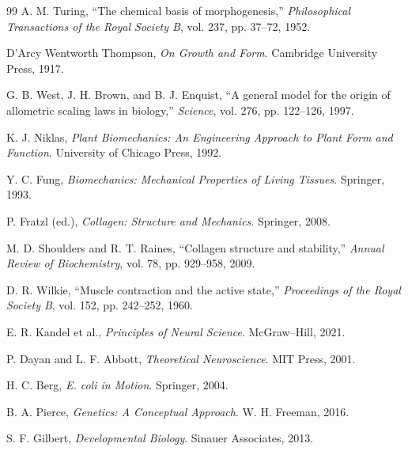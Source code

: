 \documentclass[11pt,oneside]{book}
\begin{document}
\begin{thebibliography}{99}
A. M. Turing,
“The chemical basis of morphogenesis,”
\textit{Philosophical Transactions of the Royal Society B}, vol. 237, pp. 37–72, 1952.

D’Arcy Wentworth Thompson,
\textit{On Growth and Form}.
Cambridge University Press, 1917.

G. B. West, J. H. Brown, and B. J. Enquist,
“A general model for the origin of allometric scaling laws in biology,”
\textit{Science}, vol. 276, pp. 122–126, 1997.

K. J. Niklas,
\textit{Plant Biomechanics: An Engineering Approach to Plant Form and Function}.
University of Chicago Press, 1992.

Y. C. Fung,
\textit{Biomechanics: Mechanical Properties of Living Tissues}.
Springer, 1993.

P. Fratzl (ed.),
\textit{Collagen: Structure and Mechanics}.
Springer, 2008.

M. D. Shoulders and R. T. Raines,
“Collagen structure and stability,”
\textit{Annual Review of Biochemistry}, vol. 78, pp. 929–958, 2009.

D. R. Wilkie,
“Muscle contraction and the active state,”
\textit{Proceedings of the Royal Society B}, vol. 152, pp. 242–252, 1960.

E. R. Kandel et al.,
\textit{Principles of Neural Science}.
McGraw–Hill, 2021.

P. Dayan and L. F. Abbott,
\textit{Theoretical Neuroscience}.
MIT Press, 2001.

H. C. Berg,
\textit{E. coli in Motion}.
Springer, 2004.

B. A. Pierce,
\textit{Genetics: A Conceptual Approach}.
W. H. Freeman, 2016.

S. F. Gilbert,
\textit{Developmental Biology}.
Sinauer Associates, 2013.

\end{thebibliography}
\end{document}
